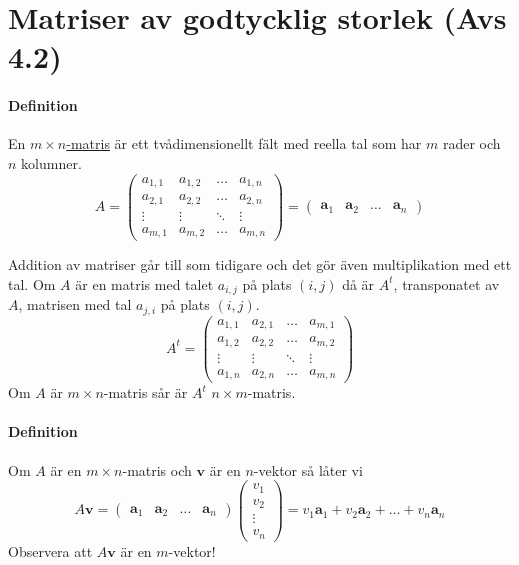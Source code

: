 \section{Matriser av godtycklig storlek (Avs 4.2)}
\paragraph{Definition} En \underline{$m\times n$-matris} är ett tvådimensionellt fält med reella tal som har $m$ rader och $n$ kolumner.
\begin{equation*}
    A=\begin{pmatrix}
        a_{1,1} & a_{1,2} & \ldots & a_{1,n}\\
        a_{2,1} & a_{2,2} & \ldots & a_{2,n}\\
        \vdots & \vdots & \ddots & \vdots\\
        a_{m,1} & a_{m,2} & \ldots & a_{m,n}
    \end{pmatrix} = \begin{pmatrix}
        \bm{a}_{1} & \bm{a}_{2} & \ldots & \bm{a}_{n}
    \end{pmatrix}
\end{equation*}

Addition av matriser går till som tidigare och det gör även multiplikation med ett tal.
Om $A$ är en matris med talet $a_{i,j}$ på plats $(i,j)$ då är $A^{t}$, transponatet av $A$, matrisen med tal $a_{j,i}$ på plats $(i,j)$.
\begin{equation*}
    A^{t}=\begin{pmatrix}
        a_{1,1} & a_{2,1} & \ldots & a_{m,1}\\
        a_{1,2} & a_{2,2} & \ldots & a_{m,2}\\
        \vdots & \vdots & \ddots & \vdots\\
        a_{1,n} & a_{2,n} & \ldots & a_{m,n}
    \end{pmatrix}
\end{equation*}
Om $A$ är $m\times n$-matris sår är $A^{t}$ $n\times m$-matris.

\paragraph{Definition} Om $A$ är en $m\times n$-matris och $\bm{v}$ är en $n$-vektor så låter vi 
\begin{equation*}
    A\bm{v}=\begin{pmatrix}
        \bm{a}_{1}&\bm{a}_{2}& \ldots &\bm{a}_{n}
    \end{pmatrix}\begin{pmatrix}
        v_{1}\\ v_{2}\\ \vdots \\ v_{n}
    \end{pmatrix}=v_{1}\bm{a}_{1}+v_{2}\bm{a}_{2}+\ldots+v_{n}\bm{a}_{n}
\end{equation*}
Observera att $A\bm{v}$ är en $m$-vektor!

